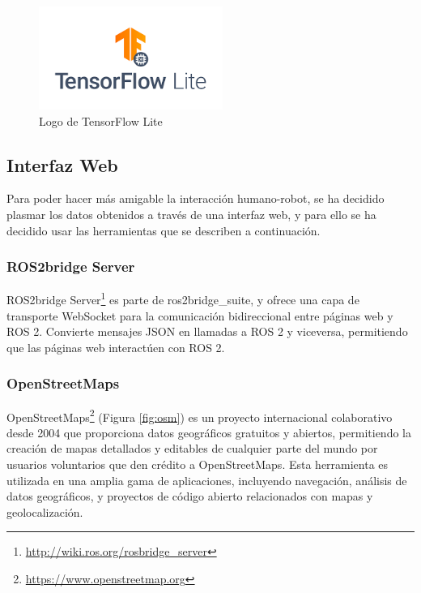 \begin{figure} [h!]
	\begin{center}
		\includegraphics[width=6cm]{figs/tflite.png}
	\end{center}
	\caption{Logo de TensorFlow Lite} %
	\label{fig:tflite}
\end{figure}


\subsection{Interfaz Web}
\label{subsec:interfazweb}

Para poder hacer más amigable la interacción humano-robot, se ha decidido plasmar los datos obtenidos a través de una interfaz web, y para ello se ha decidido usar las herramientas que se describen a continuación.
 
\subsubsection{ROS2bridge Server}
\label{subsubsec:ros2bridge}

ROS2bridge Server\footnote{\url{http://wiki.ros.org/rosbridge_server}} es parte de ros2bridge\_suite, y ofrece una capa de transporte WebSocket para la comunicación bidireccional entre páginas web y ROS 2. Convierte mensajes JSON en llamadas a ROS 2 y viceversa, permitiendo que las páginas web interactúen con ROS 2. 

\subsubsection{OpenStreetMaps}
\label{subsubsec:openstreetmaps}

OpenStreetMaps\footnote{\url{https://www.openstreetmap.org}} (Figura \ref{fig:osm}) es un proyecto internacional colaborativo desde 2004 que proporciona datos geográficos gratuitos y abiertos, permitiendo la creación de mapas detallados y editables de cualquier parte del mundo por usuarios voluntarios que den crédito a OpenStreetMaps. Esta herramienta es utilizada en una amplia gama de aplicaciones, incluyendo navegación, análisis de datos geográficos, y proyectos de código abierto relacionados con mapas y geolocalización.



